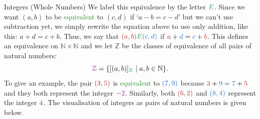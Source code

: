 \documentclass[final]{beamer}
\newlength{\colwidth}
\newcommand{\N}{\mathbb{N}}
\newcommand{\Z}{\mathbb{Z}}
\newcommand{\clr}{\textcolor{BrickRed}}
\newcommand{\clb}{\textcolor{RoyalBlue}}
\newcommand{\clg}{\textcolor{ForestGreen}}
\newcommand{\clm}{\textcolor{Fuchsia}}
\begin{document}
\begin{frame}[t]
\begin{columns}[t]
\begin{column}{\colwidth}
\begin{exampleblock}{Integers (Whole Numbers)}
  We label this equivalence by the letter $\clg{E}$. Since we want $(a,b)$ to be
  \clg{equivalent} to $(c,d)$ if `$a - b = c - d$' but we can't use subtraction
  yet, we simply rewrite the equation above to use only addition, like this: $a
  + d = c + b$. Thus, we say that $\clr{(a,b)}\clg{E}\clb{(c,d)}$ if $\clr{a} +
  \clb{d} = \clb{c} + \clr{b}$. This defines an equivalence on $\N \times \N$
  and we let $\Z$ be the classes of equivalence of all pairs of natural numbers:
  \[
   \clm{\Z} = \{[(a,b)]_{\clg{E}} \mid a,b \in \N\}.
  \]
  To give an example, the pair $\clr{(3,5)}$ is \clg{equivalent} to
  $\clb{(7,9)}$ because $\clr{3} + \clb{9} = \clb{7} + \clr{5}$ and they both
  represent the integer $\clm{-2}$. Similarly, both $\clr{(6, 2)}$ and
  $\clb{(8, 4)}$ represent the integer $\clm{4}$. The visualisation of integers
  as pairs of natural numbers is given below.
  \begin{figure}[H]
   \centering
\end{figure}
\end{exampleblock}
\end{column}
\end{columns}
\end{frame}
\end{document}

